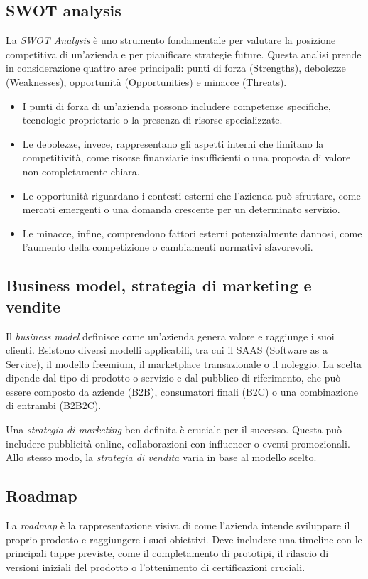 \subsection*{SWOT analysis}
La \textit{SWOT Analysis} è uno strumento fondamentale per valutare la posizione competitiva di un’azienda e per pianificare strategie future. Questa analisi prende in considerazione quattro aree principali: punti di forza (Strengths), debolezze (Weaknesses), opportunità (Opportunities) e minacce (Threats).
\begin{itemize}
    \item I punti di forza di un’azienda possono includere competenze specifiche, tecnologie proprietarie o la presenza di risorse specializzate.
    \item Le debolezze, invece, rappresentano gli aspetti interni che limitano la competitività, come risorse finanziarie insufficienti o una proposta di valore non completamente chiara.
    \item Le opportunità riguardano i contesti esterni che l’azienda può sfruttare, come mercati emergenti o una domanda crescente per un determinato servizio. 
    \item Le minacce, infine, comprendono fattori esterni potenzialmente dannosi, come l’aumento della competizione o cambiamenti normativi sfavorevoli.
\end{itemize}

\subsection*{Business model, strategia di marketing e vendite}
Il \textit{business model} definisce come un’azienda genera valore e raggiunge i suoi clienti. Esistono diversi modelli applicabili, tra cui il SAAS (Software as a Service), il modello freemium, il marketplace transazionale o il noleggio. La scelta dipende dal tipo di prodotto o servizio e dal pubblico di riferimento, che può essere composto da aziende (B2B), consumatori finali (B2C) o una combinazione di entrambi (B2B2C).

Una \textit{strategia di marketing} ben definita è cruciale per il successo. Questa può includere pubblicità online, collaborazioni con influencer o eventi promozionali. Allo stesso modo, la \textit{strategia di vendita} varia in base al modello scelto.

\subsection*{Roadmap}
La \textit{roadmap} è la rappresentazione visiva di come l’azienda intende sviluppare il proprio prodotto e raggiungere i suoi obiettivi. Deve includere una timeline con le principali tappe previste, come il completamento di prototipi, il rilascio di versioni iniziali del prodotto o l’ottenimento di certificazioni cruciali.

